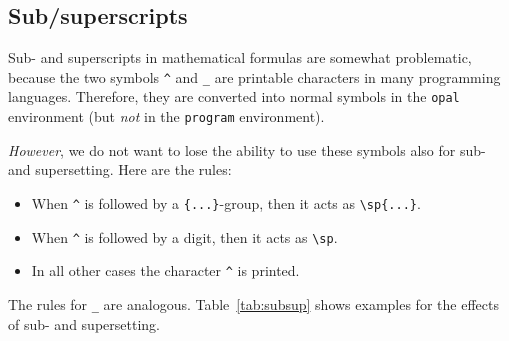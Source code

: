 \subsection{Sub/superscripts}

Sub- and superscripts in mathematical formulas are somewhat problematic,
because the two symbols \verb=^= and \verb=_= are printable characters in
many programming languages. Therefore, they are converted into normal
symbols in the \texttt{opal} environment (but \emph{not} in the
\texttt{program} environment).

\emph{However}, we do not want to lose the ability to use these symbols
also for sub- and supersetting. Here are the rules:

\begin{itemize}
  \item When \verb=^= is followed by a \verb={...}=-group, then it acts as
    \verb=\sp{...}=.
  \item When \verb=^= is followed by a digit, then it acts as \verb=\sp=.
  \item In all other cases the character \verb=^= is printed.
\end{itemize}

The rules for \verb=_= are analogous. Table~\ref{tab:subsup} shows examples
for the effects of sub- and supersetting.



